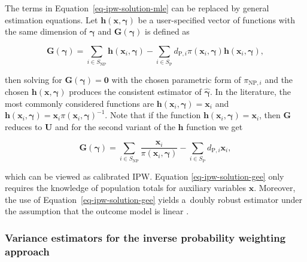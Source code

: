 \documentclass[nojss]{jss}
\begin{document}
The terms in Equation~\ref{eq-ipw-solution-mle} can be replaced by
general estimation equations. Let
\(\boldsymbol{h}(\boldsymbol{x}, \boldsymbol{\gamma})\) be a
user-specified vector of functions with the same dimension of
\(\boldsymbol{\gamma}\) and \(\boldsymbol{G}(\boldsymbol{\gamma})\) is
defined as

\begin{equation}
\label{gee}
\boldsymbol{G}(\boldsymbol{\gamma})=\sum_{i \in S_{\text{NP}}} \boldsymbol{h}\left(\boldsymbol{x}_i, \boldsymbol{\gamma}\right)-\sum_{i \in S_{\text{P}}} d_{\text{P},i} \pi\left(\boldsymbol{x}_i, \boldsymbol{\gamma}\right) \boldsymbol{h}\left(\boldsymbol{x}_i, \boldsymbol{\gamma}\right),
\end{equation}

then solving for \(\boldsymbol{G}(\boldsymbol{\gamma})=\boldsymbol{0}\)
with the chosen parametric form of \(\pi_{\text{NP},i}\) and the chosen
\(\boldsymbol{h}(\boldsymbol{x},\boldsymbol{\gamma})\) produces the
consistent estimator of \(\hat{\boldsymbol{\gamma}}\). In the
literature, the most commonly considered functions are
\(\boldsymbol{h}\left(\boldsymbol{x}_i, \boldsymbol{\gamma}\right) = \boldsymbol{x}_i\)
and
\(\boldsymbol{h}\left(\boldsymbol{x}_i, \boldsymbol{\gamma}\right) = \boldsymbol{x}_i \pi\left(\boldsymbol{x}_i, \boldsymbol{\gamma}\right)^{-1}\).
Note that if the function
\(\boldsymbol{h}\left(\boldsymbol{x}_i, \boldsymbol{\gamma}\right)=\boldsymbol{x}_i\),
then \(\boldsymbol{G}\) reduces to \(\boldsymbol{U}\) and for the second
variant of the \(\boldsymbol{h}\) function we get

\begin{equation}
\boldsymbol{G}(\boldsymbol{\gamma}) = \sum_{i \in S_{\text{NP}}} \frac{\boldsymbol{x}_i}{\pi\left(\boldsymbol{x}_i, \boldsymbol{\gamma}\right) }-\sum_{i \in S_{\text{P}}} d_{\text{P},i} \boldsymbol{x}_{i},
\label{eq-ipw-solution-gee}
\end{equation}

which can be viewed as calibrated IPW. Equation
\ref{eq-ipw-solution-gee} only requires the knowledge of population
totals for auxiliary variables \(\boldsymbol{x}\). Moreover, the use of
Equation~\ref{eq-ipw-solution-gee} yields a~doubly robust estimator
under the assumption that the outcome model is linear
\citep[cf.][]{kim_theory_2012}.

\subsubsection{Variance estimators for the inverse probability weighting
approach}\label{variance-estimators-for-the-inverse-probability-weighting-approach}
\end{document}

